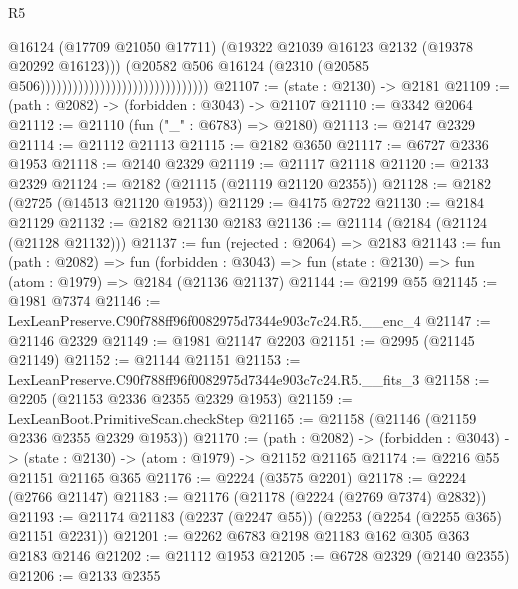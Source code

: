 \begin{lexlean}{R5}
\begin{coremodule}
                                                              @16124
                                                              (@17709 @21050 @17711)
                                                              (@19322
                                                                @21039
                                                                @16123
                                                                @2132
                                                                (@19378 @20292 @16123)))
                                                            (@20582
                                                              @506
                                                              @16124
                                                              (@2310
                                                                (@20585
                                                                  @506)))))))))))))))))))))))))))))))
@21107 := (state : @2130) -> @2181
@21109 := (path : @2082) -> (forbidden : @3043) -> @21107
@21110 := @3342 @2064
@21112 := @21110 (fun ("_" : @6783) => @2180)
@21113 := @2147 @2329
@21114 := @21112 @21113
@21115 := @2182 @3650
@21117 := @6727 @2336 @1953
@21118 := @2140 @2329
@21119 := @21117 @21118
@21120 := @2133 @2329
@21124 := @2182 (@21115 (@21119 @21120 @2355))
@21128 := @2182 (@2725 (@14513 @21120 @1953))
@21129 := @4175 @2722
@21130 := @2184 @21129
@21132 := @2182 @21130 @2183
@21136 := @21114 (@2184 (@21124 (@21128 @21132)))
@21137 := fun (rejected : @2064) => @2183
@21143 := fun (path : @2082) =>
  fun (forbidden : @3043) => fun (state : @2130) => fun (atom : @1979) => @2184 (@21136 @21137)
@21144 := @2199 @55
@21145 := @1981 @7374
@21146 := LexLeanPreserve.C90f788ff96f0082975d7344e903c7c24.R5.__enc_4
@21147 := @21146 @2329
@21149 := @1981 @21147 @2203
@21151 := @2995 (@21145 @21149)
@21152 := @21144 @21151
@21153 := LexLeanPreserve.C90f788ff96f0082975d7344e903c7c24.R5.__fits_3
@21158 := @2205 (@21153 @2336 @2355 @2329 @1953)
@21159 := LexLeanBoot.PrimitiveScan.checkStep
@21165 := @21158 (@21146 (@21159 @2336 @2355 @2329 @1953))
@21170 := (path : @2082) ->
  (forbidden : @3043) -> (state : @2130) -> (atom : @1979) -> @21152 @21165
@21174 := @2216 @55 @21151 @21165 @365
@21176 := @2224 (@3575 @2201)
@21178 := @2224 (@2766 @21147)
@21183 := @21176 (@21178 (@2224 (@2769 @7374) @2832))
@21193 := @21174 @21183 (@2237 (@2247 @55)) (@2253 (@2254 (@2255 @365) @21151 @2231))
@21201 := @2262 @6783 @2198 @21183 @162 @305 @363 @2183 @2146
@21202 := @21112 @1953
@21205 := @6728 @2329 (@2140 @2355)
@21206 := @2133 @2355

\end{coremodule}
\end{lexlean}
